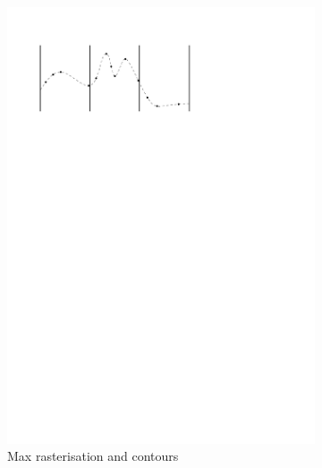 \begin{figure}
\begin{subfigure}[b]{0.3\linewidth}
    \includegraphics[width=\textwidth,page=3]{figs/maxgridding.pdf}
    \caption{Max rasterisation and contours}\label{fig:fr:mg:b}
  \end{subfigure}
  \qquad
  \begin{subfigure}[b]{0.3\linewidth}
    \centering

\end{subfigure}
\end{figure}
